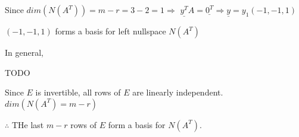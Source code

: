 \documentclass[12pt,a4paper]{article}
\begin{document}
Since $dim(N(A^T)) = m - r = 3 - 2 = 1 \Rightarrow$ 
$\underline{y^T}A = \underline{0^T} \Rightarrow \underline{y} = y_1(-1,-1,1)$

$(-1,-1,1)$ forms a basis for left nullspace $N(A^T)$

In general,

TODO

Since $E$ is invertible, all rows of $E$ are linearly independent.
$dim(N(A^T) = m - r)$

$\therefore$ THe last $m - r$ rows of $E$ form a basis for $N(A^T)$.
\end{document}

